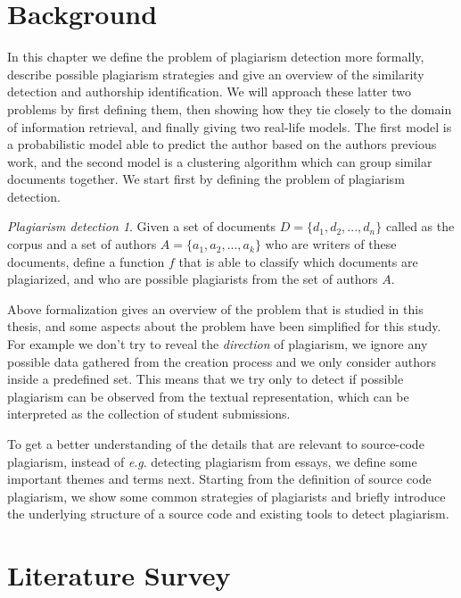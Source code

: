 \documentclass[english, grading]{tktltiki2}
\newcommand{\eg}{\textit{e}.\textit{g}. }
\theoremstyle{definition}
\theoremstyle{remark}
\numberwithin{equation}{section} %
\begin{document}
\section{Background}

In this chapter we define the problem of plagiarism detection more formally, describe possible plagiarism strategies and give an overview of the similarity detection and authorship identification. We will approach these latter two problems by first defining them, then showing how they tie closely to the domain of information retrieval, and finally giving two real-life models. The first model is a probabilistic model able to predict the author based on the authors previous work, and the second model is a clustering algorithm which can group similar documents together. We start first by defining the problem of plagiarism detection.    

\newtheorem*{sc-plg}{Plagiarism detection}
\begin{sc-plg}
Given a set of documents $D = \{d_1, d_2, ..., d_n\}$ called as the corpus and a set of authors $A = \{a_1, a_2, ..., a_k\}$ who are writers of these documents, define a function $f$ that is able to classify which documents are plagiarized, and who are possible plagiarists from the set of authors $A$.
\end{sc-plg}

Above formalization gives an overview of the problem that is studied in this thesis, and some aspects about the problem have been simplified for this study. For example we don't try to reveal the \emph{direction} of plagiarism, we ignore any possible data gathered from the creation process and we only consider authors inside a predefined set. This means that we try only to detect if possible plagiarism can be observed from the textual representation, which can be interpreted as the collection of student submissions.  

To get a better understanding of the details that are relevant to source-code plagiarism, instead of \eg detecting plagiarism from essays, we define some important themes and terms next. Starting from the definition of source code plagiarism, we show some common strategies of plagiarists and briefly introduce the underlying structure of a source code and existing tools to detect plagiarism.



\section{Literature Survey} \label{chap-liter-review}

\end{document}
